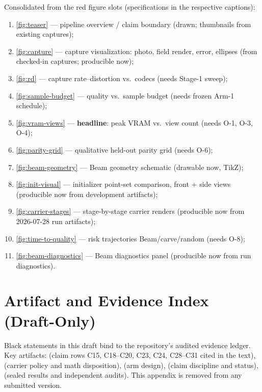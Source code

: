 Consolidated from the red figure slots (specifications in the respective captions):
\begin{enumerate}[leftmargin=1.8em,itemsep=1pt]
  \item \cref{fig:teaser} --- pipeline overview / claim boundary (drawn; thumbnails from
        existing captures);
  \item \cref{fig:capture} --- capture visualization: photo, field render, error, ellipses
        (from checked-in captures; producible now);
  \item \cref{fig:rd} --- capture rate--distortion vs.\ codecs (needs Stage-1 sweep);
  \item \cref{fig:sample-budget} --- quality vs.\ sample budget (needs frozen Arm-1
        schedule);
  \item \cref{fig:vram-views} --- \textbf{headline}: peak VRAM vs.\ view count (needs O-1,
        O-3, O-4);
  \item \cref{fig:parity-grid} --- qualitative held-out parity grid (needs O-6);
  \item \cref{fig:beam-geometry} --- Beam geometry schematic (drawable now, TikZ);
  \item \cref{fig:init-visual} --- initializer point-set comparison, front + side views
        (producible now from development artifacts);
  \item \cref{fig:carrier-stages} --- stage-by-stage carrier renders (producible now from
        2026-07-28 run artifacts);
  \item \cref{fig:time-to-quality} --- risk trajectories Beam/carve/random (needs O-8);
  \item \cref{fig:beam-diagnostics} --- Beam diagnostics panel (producible now from run
        diagnostics).
\end{enumerate}

\section{Artifact and Evidence Index (Draft-Only)}
\label{sec:artifact-index}

Black statements in this draft bind to the repository's audited evidence ledger.  Key
artifacts:  (claim rows C15, C18--C20, C23, C24, C28--C31
cited in the text),  (carrier policy and math
disposition),  (arm design),
 (claim discipline and status),
 (sealed results and independent audits).  This appendix is
removed from any submitted version.
